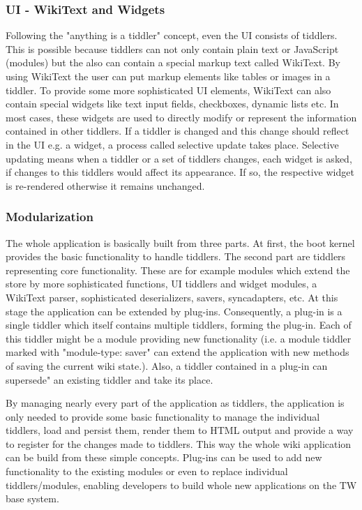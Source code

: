 \documentclass[12pt,a4paper]{article}
\newcommand{\todo}[1]{{\bf TODO: #1}\\
}
\begin{document}
\subsubsection*{UI - WikiText and Widgets}
Following the "anything is a tiddler" concept, even the UI consists of tiddlers.
This is possible because tiddlers can not only contain plain text or JavaScript (modules) but the also can contain a special markup text called WikiText.
By using WikiText the user can put markup elements like tables or images in a tiddler.
To provide some more sophisticated UI elements, WikiText can also contain special widgets like text input fields,
checkboxes, dynamic lists etc.
In most cases, these widgets are used to directly modify or represent the information contained in other tiddlers.
If a tiddler is changed and this change should reflect in the UI e.g. a widget, a process called selective update takes place. Selective updating means when a tiddler or a set of tiddlers changes, each widget is asked, if changes to this tiddlers would affect its appearance. If so, the respective widget is re-rendered otherwise it remains unchanged.

\subsubsection*{Modularization}
The whole application is basically built from three parts. At first, the boot kernel provides the basic functionality to handle tiddlers. The second part are tiddlers representing core functionality. These are for example modules which extend the store by more sophisticated functions, UI tiddlers and widget modules, a WikiText parser, sophisticated deserializers, savers, syncadapters, etc.
At this stage the application can be extended by plug-ins. Consequently, a plug-in is a single tiddler which itself contains multiple tiddlers, forming the plug-in. Each of this tiddler might be a module providing new functionality (i.e. a module tiddler marked with "module-type: saver" can extend the application with new methods of saving the current wiki state.).
Also, a tiddler contained in a plug-in can supersede" an existing tiddler and take its place.

By managing nearly every part of the application as tiddlers, the application is only needed to provide some basic functionality to manage the individual tiddlers, load and persist them, render them to HTML output and provide a way to register for the changes made to tiddlers.
This way the whole wiki application can be build from these simple concepts.
Plug-ins can be used to add new functionality to the existing modules or even to replace individual tiddlers/modules,
enabling developers to build whole new applications on the TW base system.
\end{document}

